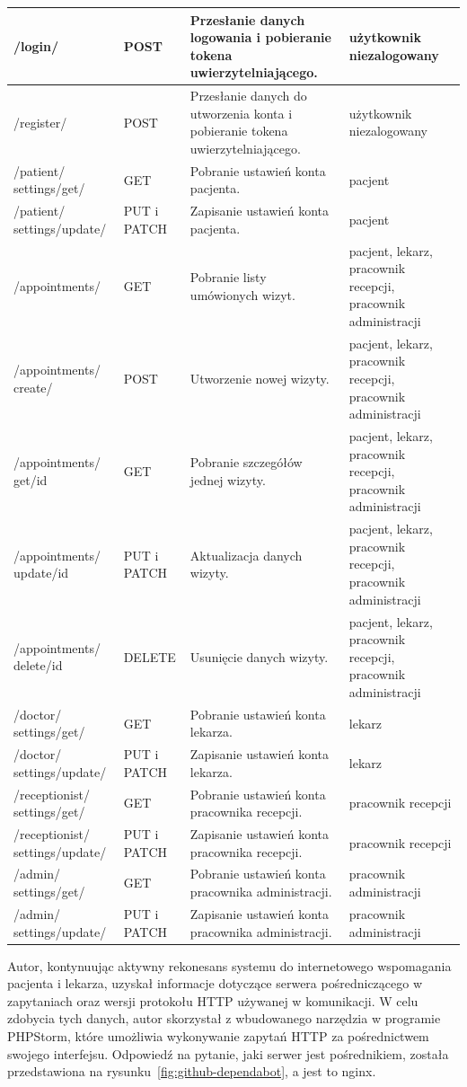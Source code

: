 \documentclass[12pt,twoside]{book}
\begin{document}
\begin{longtable}{|>{\raggedright\arraybackslash}p{3cm}|>{\raggedright\arraybackslash}p{2cm}|>{\raggedright\arraybackslash}p{5cm}|>{\raggedright\arraybackslash}p{3.5cm}|}
  /login/ & POST & Przesłanie danych logowania i pobieranie tokena uwierzytelniającego. & użytkownik niezalogowany \\ \hline
  /register/ & POST & Przesłanie danych do utworzenia konta i pobieranie tokena uwierzytelniającego. & użytkownik niezalogowany \\ \hline
  /patient/ settings/get/ & GET & Pobranie ustawień konta pacjenta. & pacjent \\ \hline
  /patient/ settings/update/ & PUT i PATCH & Zapisanie ustawień konta pacjenta. & pacjent \\ \hline
  /appointments/ & GET & Pobranie listy umówionych wizyt. & pacjent, lekarz, pracownik recepcji, pracownik administracji \\ \hline
  /appointments/ create/ & POST & Utworzenie nowej wizyty. & pacjent, lekarz, pracownik recepcji, pracownik administracji \\ \hline
  /appointments/ get/{id} & GET & Pobranie szczegółów jednej wizyty. & pacjent, lekarz, pracownik recepcji, pracownik administracji \\ \hline
  /appointments/ update/{id} & PUT i PATCH & Aktualizacja danych wizyty. & pacjent, lekarz, pracownik recepcji, pracownik administracji \\ \hline
  /appointments/ delete/{id} & DELETE & Usunięcie danych wizyty. & pacjent, lekarz, pracownik recepcji, pracownik administracji \\ \hline
  /doctor/ settings/get/ & GET & Pobranie ustawień konta lekarza. & lekarz \\ \hline
  /doctor/ settings/update/ & PUT i PATCH & Zapisanie ustawień konta lekarza. & lekarz \\ \hline
  /receptionist/ settings/get/ & GET & Pobranie ustawień konta pracownika recepcji. & pracownik recepcji \\ \hline
  /receptionist/ settings/update/ & PUT i PATCH & Zapisanie ustawień konta pracownika recepcji. & pracownik recepcji \\ \hline
  /admin/ settings/get/ & GET & Pobranie ustawień konta pracownika administracji. & pracownik administracji \\ \hline
  /admin/ settings/update/ & PUT i PATCH & Zapisanie ustawień konta pracownika administracji. & pracownik administracji \\ \hline

\end{longtable}

Autor, kontynuując aktywny rekonesans systemu do internetowego wspomagania pacjenta i lekarza, uzyskał informacje dotyczące serwera pośredniczącego w zapytaniach oraz wersji protokołu HTTP używanej w komunikacji. W celu zdobycia tych danych, autor skorzystał z wbudowanego narzędzia w programie PHPStorm, które umożliwia wykonywanie zapytań HTTP za pośrednictwem swojego interfejsu. Odpowiedź na pytanie, jaki serwer jest pośrednikiem, została przedstawiona na rysunku~\ref{fig:github-dependabot}, a jest to nginx.
\end{document}
